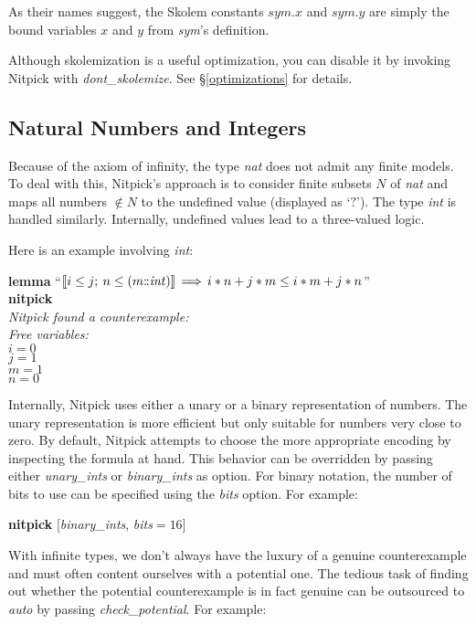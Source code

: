 \documentclass[a4paper,12pt]{article}
\def\Colon{\mathord{:\mkern-1.5mu:}}
\def\unk{{?}}
\begin{document}
As their names suggest, the Skolem constants $\mathit{sym}.x$ and
$\mathit{sym}.y$ are simply the bound variables $x$ and $y$
from \textit{sym}'s definition.

Although skolemization is a useful optimization, you can disable it by invoking
Nitpick with \textit{dont\_skolemize}. See \S\ref{optimizations} for details.

\subsection{Natural Numbers and Integers}
\label{natural-numbers-and-integers}

Because of the axiom of infinity, the type \textit{nat} does not admit any
finite models. To deal with this, Nitpick's approach is to consider finite
subsets $N$ of \textit{nat} and maps all numbers $\notin N$ to the undefined
value (displayed as `$\unk$'). The type \textit{int} is handled similarly.
Internally, undefined values lead to a three-valued logic.

Here is an example involving \textit{int}:

\prew
\textbf{lemma} ``$\lbrakk i \le j;\> n \le (m{\Colon}\mathit{int})\rbrakk \,\Longrightarrow\, i * n + j * m \le i * m + j * n$'' \\
\textbf{nitpick} \\[2\smallskipamount]
\slshape Nitpick found a counterexample: \\[2\smallskipamount]
\hbox{}\qquad Free variables: \nopagebreak \\
\hbox{}\qquad\qquad $i = 0$ \\
\hbox{}\qquad\qquad $j = 1$ \\
\hbox{}\qquad\qquad $m = 1$ \\
\hbox{}\qquad\qquad $n = 0$
\postw

Internally, Nitpick uses either a unary or a binary representation of numbers.
The unary representation is more efficient but only suitable for numbers very
close to zero. By default, Nitpick attempts to choose the more appropriate
encoding by inspecting the formula at hand. This behavior can be overridden by
passing either \textit{unary\_ints} or \textit{binary\_ints} as option. For
binary notation, the number of bits to use can be specified using
the \textit{bits} option. For example:

\prew
\textbf{nitpick} [\textit{binary\_ints}, \textit{bits}${} = 16$]
\postw

With infinite types, we don't always have the luxury of a genuine counterexample
and must often content ourselves with a potential one. The tedious task of
finding out whether the potential counterexample is in fact genuine can be
outsourced to \textit{auto} by passing \textit{check\_potential}. For example:
\end{document}

